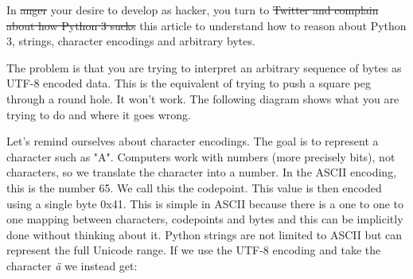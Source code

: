 \documentclass[twocolumn]{article}
\begin{document}
In \sout{anger} your desire to develop as hacker, you turn to \sout{Twitter and complain about how Python 3 sucks} this article to understand how to reason about Python 3, strings, character encodings and arbitrary bytes.

The problem is that you are trying to interpret an arbitrary sequence of bytes as UTF-8 encoded data. This is the equivalent of trying to push a square peg through a round hole. It won't work. The following diagram shows what you are trying to do and where it goes wrong.
\vspace{1mm}


\vfill\null


Let's remind ourselves about character encodings. The goal is to represent a character such as "A". Computers work with numbers (more precisely bits), not characters, so we translate the character into a number. In the ASCII encoding, this is the number 65. We call this the codepoint. This value is then encoded using a single byte 0x41. This is simple in ASCII because there is a one to one to one mapping between characters, codepoints and bytes and this can be implicitly done without thinking about it. Python strings are not limited to ASCII but can represent the full Unicode range. If we use the UTF-8 encoding and take the character \textit{ä} we instead get:
\end{document}
